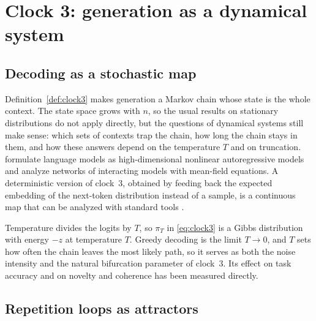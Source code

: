 \section{Clock 3: generation as a dynamical system}
\label{sec:clock3}

\subsection{Decoding as a stochastic map}

Definition~\ref{def:clock3} makes generation a Markov chain whose state is the whole context. The state space grows with $n$, so the usual results on stationary distributions do not apply directly, but the questions of dynamical systems still make sense: which sets of contexts trap the chain, how long the chain stays in them, and how these answers depend on the temperature $T$ and on truncation. \citet{krishnamurthy2026stochastic} formulate language models as high-dimensional nonlinear autoregressive models and analyze networks of interacting models with mean-field equations. A deterministic version of clock~3, obtained by feeding back the expected embedding of the next-token distribution instead of a sample, is a continuous map that can be analyzed with standard tools \citep{jones2026chaos}.

Temperature divides the logits by $T$, so $\pi_T$ in \eqref{eq:clock3} is a Gibbs distribution with energy $-z$ at temperature $T$. Greedy decoding is the limit $T\to0$, and $T$ sets how often the chain leaves the most likely path, so it serves as both the noise intensity and the natural bifurcation parameter of clock~3. Its effect on task accuracy \citep{renze2024effect} and on novelty and coherence \citep{peeperkorn2024temperature} has been measured directly.

\subsection{Repetition loops as attractors}
\label{sec:loops}

